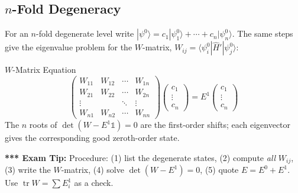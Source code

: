 \documentclass[11pt,a4paper]{article}
\begin{document}
\subsection{\texorpdfstring{$n$}{n}-Fold Degeneracy}
For an $n$-fold degenerate level write $|\psi^0\rangle = c_1|\psi_1^0\rangle + \cdots + c_n|\psi_n^0\rangle$. The same steps give the eigenvalue problem for the $W$-matrix, $W_{ij} = \langle\psi_i^0|\hat H'|\psi_j^0\rangle$:
\begin{thm}{$W$-Matrix Equation}
\[
\begin{pmatrix} W_{11} & W_{12} & \cdots & W_{1n}\\ W_{21} & W_{22} & \cdots & W_{2n}\\ \vdots & & \ddots & \vdots\\ W_{n1} & W_{n2} & \cdots & W_{nn}\end{pmatrix}
\begin{pmatrix} c_1\\ \vdots\\ c_n\end{pmatrix} = E^1\begin{pmatrix} c_1\\ \vdots\\ c_n\end{pmatrix}
\]
The $n$ roots of $\det(W - E^1\mathbb{1}) = 0$ are the first-order shifts; each eigenvector gives the corresponding good zeroth-order state.
\end{thm}
\textbf{*** Exam Tip:} Procedure: (1) list the degenerate states, (2) compute \textit{all} $W_{ij}$, (3) write the $W$-matrix, (4) solve $\det(W-E^1)=0$, (5) quote $E = E^0 + E^1$. Use $\operatorname{tr}W=\sum E^1_i$ as a check.
\end{document}
